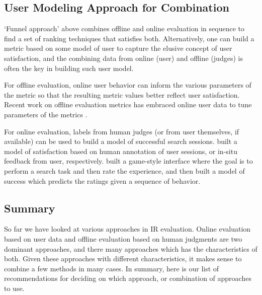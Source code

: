 \subsection{User Modeling Approach for Combination}

`Funnel approach' above combines offline and online evaluation in sequence to find a set of ranking techniques that satisfies both. Alternatively, one can build a metric based on some model of user to capture the elusive concept of user satisfaction, and the combining data from online (user) and offline (judges) is often the key in building such user model.

For offline evaluation, online user behavior can inform the various parameters of the metric so that the resulting metric values better reflect user satisfaction. Recent work on offline evaluation metrics has embraced online user data to tune parameters of the metrics \citep[for example]{CarteretteKY11, Carterette:2012,smucker12stochastic,YilmazSCR10}.

For online evaluation, labels from human judges (or from user themselves, if available) can be used to build a model of successful search sessions. \citep{Hassan:2010,Hassan:2012} built a model of satisfaction based on human annotation of user sessions, or in-situ feedback from user, respectively. \cite{Ageev:2011} built a game-style interface where the goal is to perform a search task and then rate the experience, and then built a model of success which predicts the ratings given a sequence of behavior.


\subsection{Summary}
So far we have looked at various approaches in IR evaluation. Online evaluation based on user data and offline evaluation based on human judgments are two dominant approaches, and there many approaches which has the characteristics of both. Given these approaches with different characteristics, it makes sense to combine a few methods in many cases. In summary, here is our list of recommendations for deciding on which approach, or combination of approaches to use.

